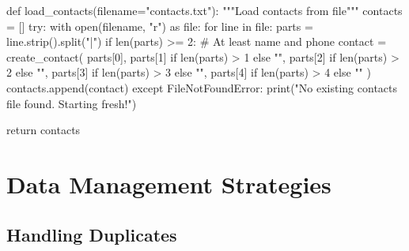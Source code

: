 \documentclass[
  letterpaper,
  DIV=11,
  numbers=noendperiod,
  oneside]{scrreprt}
\newenvironment{Shaded}{}{}
\newcommand{\BuiltInTok}[1]{\textcolor[rgb]{0.84,0.23,0.29}{#1}}
\newcommand{\CommentTok}[1]{\textcolor[rgb]{0.42,0.45,0.49}{#1}}
\newcommand{\ControlFlowTok}[1]{\textcolor[rgb]{0.84,0.23,0.29}{#1}}
\newcommand{\DecValTok}[1]{\textcolor[rgb]{0.00,0.36,0.77}{#1}}
\newcommand{\ImportTok}[1]{\textcolor[rgb]{0.01,0.18,0.38}{#1}}
\newcommand{\KeywordTok}[1]{\textcolor[rgb]{0.84,0.23,0.29}{#1}}
\newcommand{\NormalTok}[1]{\textcolor[rgb]{0.14,0.16,0.18}{#1}}
\newcommand{\OperatorTok}[1]{\textcolor[rgb]{0.14,0.16,0.18}{#1}}
\newcommand{\PreprocessorTok}[1]{\textcolor[rgb]{0.84,0.23,0.29}{#1}}
\newcommand{\StringTok}[1]{\textcolor[rgb]{0.01,0.18,0.38}{#1}}
\begin{document}
\begin{Shaded}
\begin{Highlighting}[]
\KeywordTok{def}\NormalTok{ load\_contacts(filename}\OperatorTok{=}\StringTok{"contacts.txt"}\NormalTok{):}
    \CommentTok{"""Load contacts from file"""}
\NormalTok{    contacts }\OperatorTok{=}\NormalTok{ []}
    \ControlFlowTok{try}\NormalTok{:}
        \ControlFlowTok{with} \BuiltInTok{open}\NormalTok{(filename, }\StringTok{"r"}\NormalTok{) }\ImportTok{as} \BuiltInTok{file}\NormalTok{:}
            \ControlFlowTok{for}\NormalTok{ line }\KeywordTok{in} \BuiltInTok{file}\NormalTok{:}
\NormalTok{                parts }\OperatorTok{=}\NormalTok{ line.strip().split(}\StringTok{"|"}\NormalTok{)}
                \ControlFlowTok{if} \BuiltInTok{len}\NormalTok{(parts) }\OperatorTok{\textgreater{}=} \DecValTok{2}\NormalTok{:  }\CommentTok{\# At least name and phone}
\NormalTok{                    contact }\OperatorTok{=}\NormalTok{ create\_contact(}
\NormalTok{                        parts[}\DecValTok{0}\NormalTok{],}
\NormalTok{                        parts[}\DecValTok{1}\NormalTok{] }\ControlFlowTok{if} \BuiltInTok{len}\NormalTok{(parts) }\OperatorTok{\textgreater{}} \DecValTok{1} \ControlFlowTok{else} \StringTok{""}\NormalTok{,}
\NormalTok{                        parts[}\DecValTok{2}\NormalTok{] }\ControlFlowTok{if} \BuiltInTok{len}\NormalTok{(parts) }\OperatorTok{\textgreater{}} \DecValTok{2} \ControlFlowTok{else} \StringTok{""}\NormalTok{,}
\NormalTok{                        parts[}\DecValTok{3}\NormalTok{] }\ControlFlowTok{if} \BuiltInTok{len}\NormalTok{(parts) }\OperatorTok{\textgreater{}} \DecValTok{3} \ControlFlowTok{else} \StringTok{""}\NormalTok{,}
\NormalTok{                        parts[}\DecValTok{4}\NormalTok{] }\ControlFlowTok{if} \BuiltInTok{len}\NormalTok{(parts) }\OperatorTok{\textgreater{}} \DecValTok{4} \ControlFlowTok{else} \StringTok{""}
\NormalTok{                    )}
\NormalTok{                    contacts.append(contact)}
    \ControlFlowTok{except} \PreprocessorTok{FileNotFoundError}\NormalTok{:}
        \BuiltInTok{print}\NormalTok{(}\StringTok{"No existing contacts file found. Starting fresh!"}\NormalTok{)}
    
    \ControlFlowTok{return}\NormalTok{ contacts}
\end{Highlighting}
\end{Shaded}

\section{Data Management Strategies}\label{data-management-strategies}

\subsection{Handling Duplicates}\label{handling-duplicates}
\end{document}
